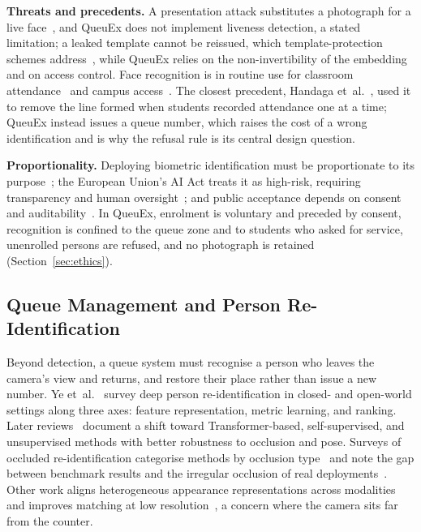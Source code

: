 \documentclass{research}
\newcommand{\sysname}{QueuEx}
\begin{document}
\textbf{Threats and precedents.} A presentation attack substitutes a
photograph for a live face~\cite{yu2024antispoofing}, and \sysname{} does
not implement liveness detection, a stated limitation; a leaked template
cannot be reissued, which template-protection schemes
address~\cite{rathgeb2021templateprotection}, while \sysname{} relies on
the non-invertibility of the embedding and on access control. Face
recognition is in routine use for classroom
attendance~\cite{patel2025classroomcctv,transferattendance2021} and
campus access~\cite{campusaccess2024}. The closest precedent, Handaga
et~al.~\cite{handaga2019queue}, used it to remove the line formed when
students recorded attendance one at a time; \sysname{} instead issues a
queue number, which raises the cost of a wrong identification and is why
the refusal rule is its central design question.

\textbf{Proportionality.} Deploying biometric identification must be
proportionate to its purpose~\cite{negri2024deploy}; the European
Union's AI Act treats it as high-risk, requiring transparency and human
oversight~\cite{aiactbiometric2025}; and public acceptance depends on
consent and auditability~\cite{remotebiometric2024}. In \sysname{},
enrolment is voluntary and preceded by consent, recognition is confined
to the queue zone and to students who asked for service, unenrolled
persons are refused, and no photograph is retained
(Section~\ref{sec:ethics}).

\subsection{Queue Management and Person Re-Identification}
Beyond detection, a queue system must recognise a person who leaves the
camera's view and returns, and restore their place rather than issue a
new number. Ye et~al.~\cite{ye2022reid} survey deep person
re-identification in closed- and open-world settings along three axes:
feature representation, metric learning, and ranking. Later
reviews~\cite{wang2024reid,asperti2025reid} document a shift toward
Transformer-based, self-supervised, and unsupervised methods with better
robustness to occlusion and pose. Surveys of occluded re-identification
categorise methods by occlusion
type~\cite{rrlcomp006deeplearningoccluded} and note the gap between
benchmark results and the irregular occlusion of real
deployments~\cite{rrlcomp007occludedpersonidentification}. Other work
aligns heterogeneous appearance representations across
modalities~\cite{rrlcomp079crossmodalityperson} and improves matching at
low resolution~\cite{rrlcomp088personidentificationenhanced}, a concern
where the camera sits far from the counter.
\end{document}
